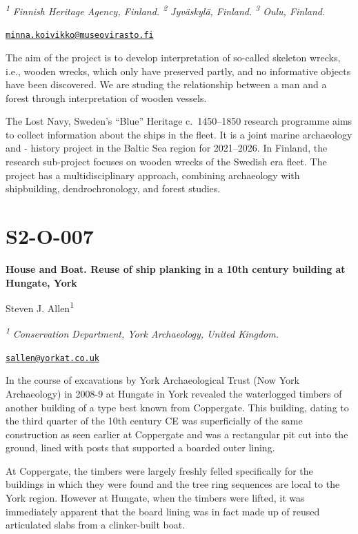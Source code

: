 \documentclass[
]{book}
\begin{document}
\textsuperscript{\emph{1}} \emph{Finnish Heritage Agency, Finland. \textsuperscript{2} Jyväskylä, Finland. \textsuperscript{3} Oulu, Finland.}

\href{mailto:minna.koivikko@museovirasto.fi}{\nolinkurl{minna.koivikko@museovirasto.fi}}

The aim of the project is to develop interpretation of so-called skeleton wrecks, i.e., wooden wrecks, which only have preserved partly, and no informative objects have been discovered. We are studing the relationship between a man and a forest through interpretation of wooden vessels.

The Lost Navy, Sweden's ``Blue'' Heritage c.~1450--1850 research programme aims to collect information about the ships in the fleet. It is a joint marine archaeology and - history project in the Baltic Sea region for 2021--2026. In Finland, the research sub-project focuses on wooden wrecks of the Swedish era fleet. The project has a multidisciplinary approach, combining archaeology with shipbuilding, dendrochronology, and forest studies.

\hypertarget{s2-o-007}{%
\section*{S2-O-007}\label{s2-o-007}}

\textbf{House and Boat. Reuse of ship planking in a 10th century building at Hungate, York}

Steven J. Allen\textsuperscript{1}

\textsuperscript{\emph{1}} \emph{Conservation Department, York Archaeology, United Kingdom.}

\href{mailto:sallen@yorkat.co.uk}{\nolinkurl{sallen@yorkat.co.uk}}

In the course of excavations by York Archaeological Trust (Now York Archaeology) in 2008-9 at Hungate in York revealed the waterlogged timbers of another building of a type best known from Coppergate. This building, dating to the third quarter of the 10th century CE was superficially of the same construction as seen earlier at Coppergate and was a rectangular pit cut into the ground, lined with posts that supported a boarded outer lining.

At Coppergate, the timbers were largely freshly felled specifically for the buildings in which they were found and the tree ring sequences are local to the York region. However at Hungate, when the timbers were lifted, it was immediately apparent that the board lining was in fact made up of reused articulated slabs from a clinker-built boat.
\end{document}
